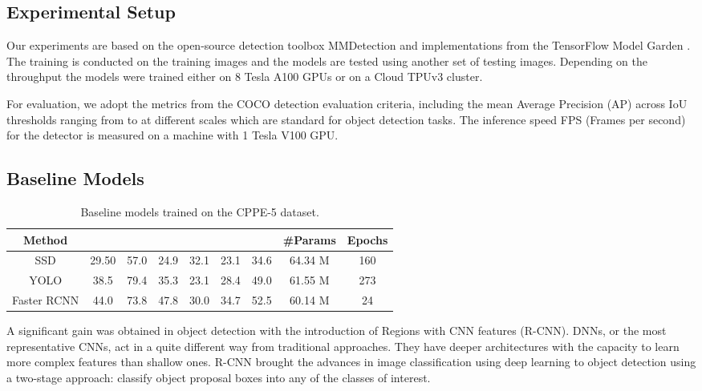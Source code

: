 \documentclass{article}
\begin{document}
\subsection{Experimental Setup}
\label{Experimental Setup}

Our experiments are based on the open-source detection toolbox MMDetection \cite{mmdetection} and implementations from the TensorFlow Model Garden \cite{tensorflowmodelgarden2020}. The training is conducted on the  training images and the models are tested using another set of  testing images. Depending on the throughput the models were trained either on 8 Tesla A100 GPUs or on a Cloud TPUv3 cluster.

For evaluation, we adopt the metrics from the COCO detection evaluation criteria, including the mean Average Precision (AP) across IoU thresholds ranging from  to  at different scales which are standard for object detection tasks. The inference speed FPS (Frames per second) for the detector is measured on a machine with 1 Tesla V100 GPU.

\subsection{Baseline Models}
\label{Baseline Models}

\begin{table}
    \caption{Baseline models trained on the CPPE-5 dataset.}
    \centering
    \begin{tabular}{c|c|ccccc|c|c}
        \toprule
        Method &  &  &  &  &  &  & \#Params & Epochs \\
        \hline
        SSD \cite{10.1007/978-3-319-46448-0_2} & 29.50 & 57.0 & 24.9 & 32.1 & 23.1 & 34.6 & 64.34 M & 160 \\
        YOLO \cite{redmon2018yolov3} & 38.5 & 79.4 & 35.3 & 23.1 & 28.4 & 49.0 & 61.55 M & 273 \\
        Faster RCNN \cite{7485869} & 44.0 & 73.8 & 47.8 & 30.0 & 34.7 & 52.5 & 60.14 M & 24 \\
        \bottomrule
    \end{tabular}
    \label{tab:baseline}
\end{table}

A significant gain was obtained in object detection with the introduction of Regions with CNN features (R-CNN). DNNs, or the most representative CNNs, act in a quite different way from traditional approaches. They have deeper architectures with the capacity to learn more complex features than shallow ones. R-CNN \cite{girshick2014rich} brought the advances in image classification using deep learning to object detection using a two-stage approach: classify object proposal boxes into any of the classes of interest.
\end{document}
